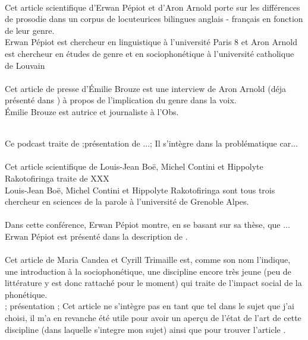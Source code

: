 \cite{Pep20} \\
      Cet article scientifique d'Erwan Pépiot et d'Aron Arnold porte sur les différences de prosodie dans un corpus de locuteurices bilingues anglais - français en fonction de leur genre.\\
      Erwan Pépiot est chercheur en linguistique à l'université Paris 8 et Aron Arnold est chercheur en études de genre et en sociophonétique à l'université catholique de Louvain \\

\cite{Bro18} \\
      Cet article de presse d'Émilie Brouze est une interview de Aron Arnold (déja présenté dans \cite{Pep20}) à propos de l'implication du genre dans la voix.\\
      Émilie Brouze est autrice et journaliste à l'Obs.

\cite{podcast} \\
      Ce podcast traite de 
      ;présentation de ...;
      Il s'intègre dans la problématique car...\\

\cite{Boe75} \\
      Cet article scientifique de Louis-Jean Boë, Michel Contini et Hippolyte Rakotofiringa traite de XXX\\
      Louis-Jean Boë, Michel Contini et Hippolyte Rakotofiringa sont tous trois chercheur en sciences de la parole à l'université de Grenoble Alpes.\\

\cite{Pep16} \\
      Dans cette conférence, Erwan Pépiot montre, en se basant sur sa thèse, que ...\\
      Erwan Pépiot est présenté dans la description de \cite{Pep20}.\\

\cite{Can15} \\
      Cet article de Maria Candea et Cyrill Trimaille est, comme son nom l'indique, une introduction à la sociophonétique, une discipline encore très jeune (peu de littérature y est donc rattaché pour le moment) qui traite de l'impact social de la phonétique.\\
      ; présentation ;
      Cet article ne s'intègre pas en tant que tel dans le sujet que j'ai choisi, il m'a en revanche été utile pour avoir un aperçu de l'état de l'art de cette discipline (dans laquelle s'integre mon sujet) ainsi que pour trouver l'article \cite{Pep20}.\\
      
